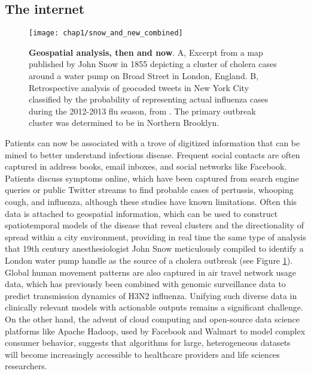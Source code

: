 \subsection{The internet}

\begin{figure}[htb]
  \texttt{[image: chap1/snow\_and\_new\_combined]}               
  \caption[Geospatial analysis, then and now]{\textbf{Geospatial analysis, then and now}. A, Excerpt from a map published by John Snow in 1855 depicting a cluster of cholera cases around a water pump on Broad Street in London, England. B, Retrospective analysis of geocoded tweets in New York City classified by the probability of representing actual influenza cases during the 2012-2013 flu season, from \textcite{Nagar2014}. The primary outbreak cluster was determined to be in Northern Brooklyn.}
  \label{fig:snow_and_new_combined}
\end{figure}

Patients can now be associated with a trove of digitized information that can be mined to better understand infectious disease. Frequent social contacts are often captured in address books, email inboxes, and social networks like Facebook. Patients discuss symptoms online, which have been captured from search engine queries\autocite{Ginsberg2009} or public Twitter streams to find probable cases of pertussis, whooping cough, and influenza,\autocite{Nagel2013} although these studies have known limitations.\autocite{Lazer2014} Often this data is attached to geospatial information, which can be used to construct spatiotemporal models of the disease that reveal clusters and the directionality  of spread within a city environment,\autocite{Nagar2014} providing in real time the same type of analysis that 19th century anesthesiologist John Snow meticulously compiled to identify a London water pump handle as the source of a cholera outbreak (see Figure \ref{fig:snow_and_new_combined}).\autocite{Buechner2004,Snow1855} Global human movement patterns are also captured in air travel network usage data, which has previously been combined with genomic surveillance data to predict transmission dynamics of H3N2 influenza.\autocite{Lemey2014} Unifying such diverse data in clinically relevant models with actionable outputs remains a significant challenge. On the other hand, the advent of cloud computing and open-source data science platforms like Apache Hadoop, used by Facebook and Walmart to model complex consumer behavior, suggests that algorithms for large, heterogeneous datasets will become increasingly accessible to healthcare providers and life sciences researchers.\autocite{Mohammed2014}

